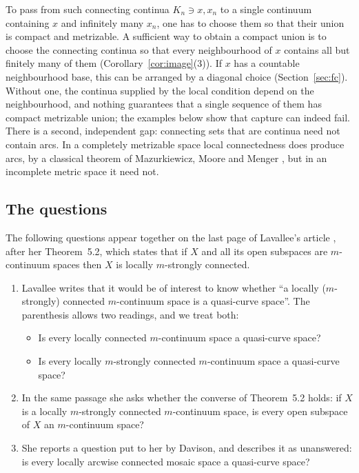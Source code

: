 \documentclass[11pt]{amsart}
\theoremstyle{definition}
\theoremstyle{remark}
\numberwithin{equation}{section}
\begin{document}
To pass from such connecting continua $K_n\ni x,x_n$ to a single continuum containing $x$ and infinitely many $x_n$, one has to choose them so that their union is compact and metrizable. A sufficient way to obtain a compact union is to choose the connecting continua so that every neighbourhood of $x$ contains all but finitely many of them (Corollary~\ref{cor:image}(3)). If $x$ has a countable neighbourhood base, this can be arranged by a diagonal choice (Section~\ref{sec:fc}). Without one, the continua supplied by the local condition depend on the neighbourhood, and nothing guarantees that a single sequence of them has compact metrizable union; the examples below show that capture can indeed fail. There is a second, independent gap: connecting sets that are continua need not contain arcs. In a completely metrizable space local connectedness does produce arcs, by a classical theorem of Mazurkiewicz, Moore and Menger \cite[Section~6.3]{engelking}, but in an incomplete metric space it need not.

\subsection{The questions}
The following questions appear together on the last page of Lavallee's article \cite[p.~1333]{lavallee64}, after her Theorem~5.2, which states that if $X$ and all its open subspaces are $m$-continuum spaces then $X$ is locally $m$-strongly connected.

\begin{enumerate}[label=\textbf{Q\arabic*.},leftmargin=3.2em]
\item Lavallee writes that it would be of interest to know whether ``a locally ($m$-strongly) connected $m$-continuum space is a quasi-curve space''. The parenthesis allows two readings, and we treat both:
\begin{itemize}[leftmargin=2.2em]
\item[\textbf{Q1a.}] Is every locally connected $m$-continuum space a quasi-curve space?
\item[\textbf{Q1b.}] Is every locally $m$-strongly connected $m$-continuum space a quasi-curve space?
\end{itemize}
\item In the same passage she asks whether the converse of Theorem~5.2 holds: if $X$ is a locally $m$-strongly connected $m$-continuum space, is every open subspace of $X$ an $m$-continuum space?
\item She reports a question put to her by Davison, and describes it as unanswered: is every locally arcwise connected mosaic space a quasi-curve space?
\end{enumerate}
\end{document}
